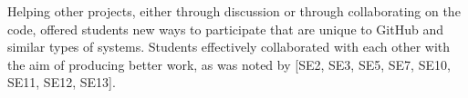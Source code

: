 Helping other projects, either through discussion or through collaborating on the code, offered students new ways to participate that are unique to GitHub and similar types of systems. Students effectively collaborated with each other with the aim of producing better work, as was noted by [SE2, SE3, SE5, SE7, SE10, SE11, SE12, SE13]. \\




